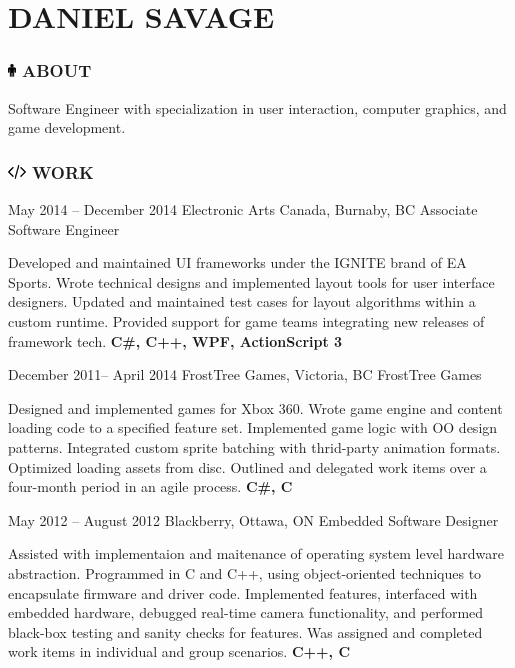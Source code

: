 \documentclass[10pt]{tccv}
\begin{document}
\part{DANIEL SAVAGE}

\flafamily

\section{\textcolor{black}{\includegraphics[height=10pt, keepaspectratio=true]{male}} ABOUT}

Software Engineer with specialization in user interaction, computer graphics, and game development.

\section{\includegraphics[height=10pt, keepaspectratio=true]{code} WORK}

\begin{eventlist}

\item{May 2014 -- December 2014}
     {Electronic Arts Canada, Burnaby, BC}
     {Associate Software Engineer}

Developed and maintained UI frameworks under the IGNITE brand of EA Sports. Wrote technical designs and implemented layout tools for user interface designers. Updated and maintained test cases for layout algorithms within a custom runtime. Provided support for game teams integrating new releases of framework tech. \textbf{C\#, C++, WPF, ActionScript 3}

\item{December 2011-- April 2014}
     {FrostTree Games, Victoria, BC}
     {FrostTree Games}

Designed and implemented games for Xbox 360. Wrote game engine and content loading code to a specified feature set. Implemented game logic with OO design patterns. Integrated custom sprite batching with thrid-party animation formats. Optimized loading assets from disc. Outlined and delegated work items over a four-month period in an agile process. \textbf{C\#, C}

\item{May 2012 -- August 2012}
     {Blackberry, Ottawa, ON}
     {Embedded Software Designer}

Assisted with implementaion and maitenance of operating system level hardware abstraction. Programmed in C and C++, using object-oriented techniques to encapsulate firmware and driver code. Implemented features, interfaced with embedded hardware, debugged real-time camera functionality, and performed black-box testing and sanity checks for features. Was assigned and completed work items in individual and group scenarios. \textbf{C++, C}

\end{eventlist}
\end{document}
